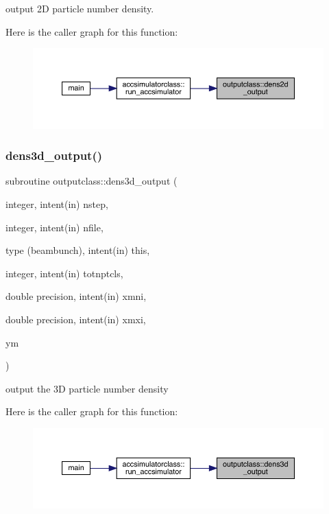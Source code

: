 output 2D particle number density. 

Here is the caller graph for this function\+:\nopagebreak
\begin{figure}[H]
\begin{center}
\leavevmode
\includegraphics[width=350pt]{namespaceoutputclass_ab7f55098e75e7410bbbb6ffa50148508_icgraph}
\end{center}
\end{figure}
\mbox{\label{namespaceoutputclass_a49102c15c2635cf9b329a9ccb56a8db2}} 
\subsubsection{\texorpdfstring{dens3d\_output()}{dens3d\_output()}}
{\footnotesize\ttfamily subroutine outputclass\+::dens3d\+\_\+output (\begin{DoxyParamCaption}\item[{integer, intent(in)}]{nstep,  }\item[{integer, intent(in)}]{nfile,  }\item[{type (beambunch), intent(in)}]{this,  }\item[{integer, intent(in)}]{totnptcls,  }\item[{double precision, intent(in)}]{xmni,  }\item[{double precision, intent(in)}]{xmxi,  }\item[{}]{ym }\end{DoxyParamCaption})}



output the 3D particle number density 

Here is the caller graph for this function\+:\nopagebreak
\begin{figure}[H]
\begin{center}
\leavevmode
\includegraphics[width=350pt]{namespaceoutputclass_a49102c15c2635cf9b329a9ccb56a8db2_icgraph}
\end{center}
\end{figure}
\mbox{\label{namespaceoutputclass_aa94732fb01ea05e3a65d2cb9aa5a0402}} 
